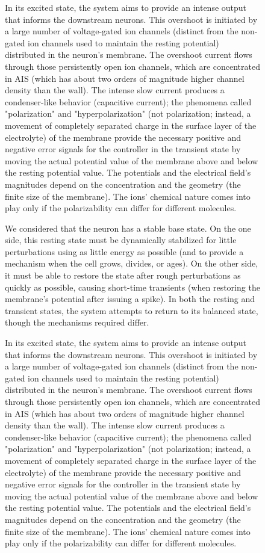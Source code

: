 \begin{figure}
In its excited state, the system aims to provide an intense output that informs the downstream neurons.
This overshoot is initiated by a large number of voltage-gated ion channels (distinct from the non-gated ion channels used to maintain the resting potential) distributed in the neuron's membrane.
The overshoot current flows through those persistently open ion channels, which are concentrated in \gls{AIS} (which has about two orders of magnitude higher channel density than the wall).
The intense slow current produces a condenser-like behavior (capacitive current); the phenomena called "polarization" and "hyperpolarization" (not polarization; instead, a movement of completely separated charge in the surface layer of the electrolyte) of the membrane provide the necessary positive and negative error signals for the controller in the transient state by moving the actual potential value of the membrane above and below the resting potential value. The potentials and the electrical field's magnitudes 
depend on the concentration and the geometry (the finite size of the membrane). The ions' chemical nature comes into play only if the polarizability can differ 
for different molecules.

\else

We considered that the neuron has a stable base state. On the one side, this resting state must be dynamically stabilized for little perturbations using as little energy as possible
(and to provide a mechanism when the cell grows, divides, or ages). On the other side, it must be able to restore the state after rough perturbations as quickly as possible, causing short-time transients (when restoring the
membrane's potential after issuing a spike).
In both the resting and transient states, the system attempts to return to its balanced state, though the mechanisms required differ. 

In its excited state, the system aims to provide an intense output that informs the downstream neurons.
This overshoot is initiated by a large number of voltage-gated ion channels (distinct from the non-gated ion channels used to maintain the resting potential) distributed in the neuron's membrane.
The overshoot current flows through those persistently open ion channels, which are concentrated in \gls{AIS} (which has about two orders of magnitude higher channel density than the wall).
The intense slow current produces a condenser-like behavior (capacitive current); the phenomena called "polarization" and "hyperpolarization" (not polarization; instead, a movement of completely separated charge in the surface layer of the electrolyte) of the membrane provide the necessary positive and negative error signals for the controller in the transient state by moving the actual potential value of the membrane above and below the resting potential value. The potentials and the electrical field's magnitudes 
depend on the concentration and the geometry (the finite size of the membrane). The ions' chemical nature comes into play only if the polarizability can differ 
for different molecules.
\fi


\end{figure}
